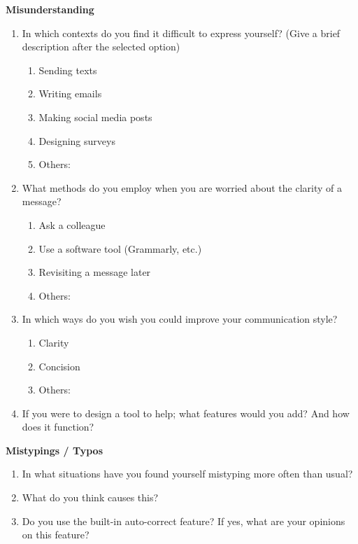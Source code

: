 \documentclass[acmsmall,screen,authorversion,nonacm]{acmart}
\begin{document}
\textbf{Misunderstanding}
\begin{enumerate}
    \item In which contexts do you find it difficult to express yourself? (Give a brief description after the selected option)
        \begin{enumerate}
            \item Sending texts
            \item Writing emails
            \item Making social media posts
            \item Designing surveys
            \item Others: 
        \end{enumerate}
    \item What methods do you employ when you are worried about the clarity of a message?
        \begin{enumerate}
            \item Ask a colleague
            \item Use a software tool (Grammarly, etc.)
            \item Revisiting a message later
            \item Others:
        \end{enumerate}
    \item In which ways do you wish you could improve your communication style?
        \begin{enumerate}
            \item Clarity
            \item Concision
            \item Others:
        \end{enumerate}
    \item If you were to design a tool to help; what features would you add? And how does it function?
\end{enumerate}

\textbf{Mistypings / Typos}
\begin{enumerate}
    \item In what situations have you found yourself mistyping more often than usual?
    \item What do you think causes this?
    \item Do you use the built-in auto-correct feature? If yes, what are your opinions on this feature?
\end{enumerate}
\end{document}
